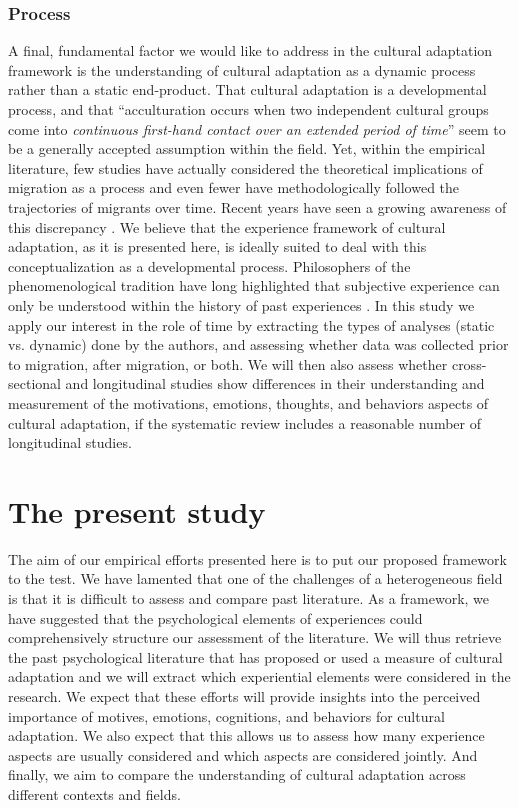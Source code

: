 \documentclass[man, 12pt, a4paper]{apa7}
\begin{document}
\subsubsection{Process} 
A final, fundamental factor we would like to address in the cultural adaptation framework is the understanding of cultural adaptation as a dynamic process rather than a static end-product. That cultural adaptation is a developmental process, and that ``acculturation occurs when two independent cultural groups come into \textit{continuous first-hand contact over an extended period of time}'' \citep[][186]{Berry1989} seem to be a generally accepted assumption within the field. Yet, within the empirical literature, few studies have actually considered the theoretical implications of migration as a process and even fewer have methodologically followed the trajectories of migrants over time. Recent years have seen a growing awareness of this discrepancy \citep[e.g.,][]{Brown2011, Ward2019}. We believe that the experience framework of cultural adaptation, as it is presented here, is ideally suited to deal with this conceptualization as a developmental process. Philosophers of the phenomenological tradition have long highlighted that subjective experience can only be understood within the history of past experiences \citep[e.g.,][; also see Figure \ref{fig:ModelContext}]{Heidegger1867}. In this study we apply our interest in the role of time by extracting the types of analyses (static vs. dynamic) done by the authors, and assessing whether data was collected prior to migration, after migration, or both. We will then also assess whether cross-sectional and longitudinal studies show differences in their understanding and measurement of the motivations, emotions, thoughts, and behaviors aspects of cultural adaptation, if the systematic review includes a reasonable number of longitudinal studies.

\section{The present study}
The aim of our empirical efforts presented here is to put our proposed framework to the test. We have lamented that one of the challenges of a heterogeneous field is that it is difficult to assess and compare past literature. As a framework, we have suggested that the psychological elements of experiences could comprehensively structure our assessment of the literature. We will thus retrieve the past psychological literature that has proposed or used a measure of cultural adaptation and we will extract which experiential elements were considered in the research. We expect that these efforts will provide insights into the perceived importance of motives, emotions, cognitions, and behaviors for cultural adaptation. We also expect that this allows us to assess how many experience aspects are usually considered and which aspects are considered jointly. And finally, we aim to compare the understanding of cultural adaptation across different contexts and fields. 
\end{document}
